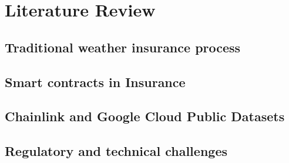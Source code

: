 \chapter{Literature Review}\label{chapter:literature_review}
\section{Traditional weather insurance process}\label{section:traditional_weather_insurance_process}
\section{Smart contracts in Insurance}\label{section:smart_contracts_insurance}
\section{Chainlink and Google Cloud Public Datasets}\label{section:chainlink_google_cloud_datasets}
\section{Regulatory and technical challenges}\label{section:regulatory_technical_challenges}

